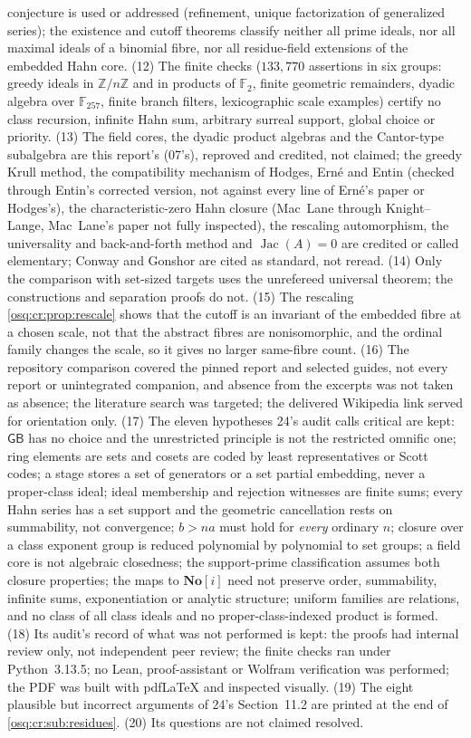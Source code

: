 \documentclass[11pt,letterpaper]{article}
\numberwithin{equation}{section}
\theoremstyle{definition}
\theoremstyle{remark}
\theoremstyle{plain}
\newcommand{\No}{\mathbf{No}}
\newcommand{\SC}{\No[i]}
\newcommand{\Z}{\mathbb Z}
\newcommand{\F}{\mathbb F}
\newcommand{\Jac}{\operatorname{Jac}}
\begin{document}
conjecture is used or addressed (refinement, unique factorization of generalized series); the existence and cutoff theorems classify neither all prime
ideals, nor all maximal ideals of a binomial fibre, nor all residue-field extensions of the embedded Hahn core. (12) The finite checks
($133{,}770$ assertions in six groups: greedy ideals in $\Z/n\Z$ and in products of $\F_2$, finite geometric remainders, dyadic algebra over $\F_{257}$,
finite branch filters, lexicographic scale examples) certify no class recursion, infinite Hahn sum, arbitrary surreal support, global choice or priority.
(13) The field cores, the dyadic product algebras and the Cantor-type subalgebra are this report's (07's), reproved and credited, not claimed; the greedy
Krull method, the compatibility mechanism of Hodges, Ern\'e and Entin (checked through Entin's corrected version, not against every line of Ern\'e's paper
or Hodges's), the characteristic-zero Hahn closure (Mac~Lane through Knight--Lange, Mac~Lane's paper not fully inspected), the rescaling automorphism, the
universality and back-and-forth method and $\Jac(A)=0$ are credited or called elementary; Conway and Gonshor are cited as standard, not reread. (14) Only
the comparison with set-sized targets uses the unrefereed universal theorem; the constructions and separation proofs do not. (15) The rescaling
\cref{osq:cr:prop:rescale} shows that the cutoff is an invariant of the embedded fibre at a chosen scale, not that the abstract fibres are
nonisomorphic, and the ordinal family changes the scale, so it gives no larger same-fibre count. (16) The repository comparison covered the pinned
report and selected guides, not every report or unintegrated companion, and absence from the excerpts was not taken as absence; the literature search
was targeted; the delivered Wikipedia link served for orientation only. (17) The eleven hypotheses 24's audit calls critical are kept: $\mathsf{GB}$ has
no choice and the unrestricted principle is not the restricted omnific one; ring elements are sets and cosets are coded by least representatives or Scott
codes; a stage stores a set of generators or a set partial embedding, never a proper-class ideal; ideal membership and rejection witnesses are finite
sums; every Hahn series has a set support and the geometric cancellation rests on summability, not convergence; $b>na$ must hold for \emph{every}
ordinary $n$; closure over a class exponent group is reduced polynomial by polynomial to set groups; a field core is not algebraic closedness; the
support-prime classification assumes both closure properties; the maps to $\SC$ need not preserve order, summability, infinite sums, exponentiation or
analytic structure; uniform families are relations, and no class of all class ideals and no proper-class-indexed product is formed. (18) Its audit's
record of what was not performed is kept: the proofs had internal review only, not independent peer review; the finite checks ran under Python~3.13.5;
no Lean, proof-assistant or Wolfram verification was performed; the PDF was built with pdfLaTeX and inspected visually. (19) The eight plausible but
incorrect arguments of 24's Section~11.2 are printed at the end of \cref{osq:cr:sub:residues}. (20) Its questions are not claimed resolved.
\end{document}
